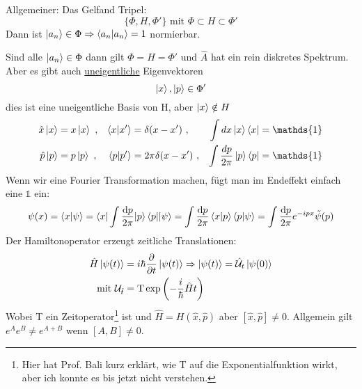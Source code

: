 		Allgemeiner: Das Gelfand Tripel:
			\begin{equation*}
				\{\Phi, H, \Phi'\} \text{~mit~} \Phi \subset H \subset \Phi'
			\end{equation*}
		Dann ist $\ket{a_n} \in \Phi \Rightarrow \braket{a_n | a_n} = 1$ normierbar.
		
		Sind alle $\ket{a_n} \in \Phi$ dann gilt $\Phi = H = \Phi'$ und $\hat{A}$ hat ein rein diskretes Spektrum.
		Aber es gibt auch \underline{uneigentliche} Eigenvektoren
			\begin{equation*}
				\ket{x}, \ket{p} \in \Phi'
			\end{equation*}
		dies ist eine uneigentliche Basis von H, aber $\ket{x} \notin H$
			\begin{align*}
				\hat{x} \ket{x} &= x \ket{x} ~,& \braket{ x | x'} &= \delta(x-x') ~,& \int dx \ket{x} \bra{x} &= \mathds{1} \\		
				\hat{p} \ket{p} &= p \ket{p} ~,& \braket{ p|p'} &= 2\pi \delta (x-x') ~,& \int \frac{dp}{2\pi} \ket{p} \bra{p} &= \mathds{1}
			\end{align*}		
		Wenn wir eine Fourier Transformation machen, fügt man im Endeffekt einfach eine $\mathds{1}$ ein:
			\begin{align*}
				\psi(x) =
				\braket{ x|\psi } = \braket{x | \int \frac{\mathrm{d} p}{2\pi} | p} \braket{p | |\psi} =
				\int \frac{\mathrm{d} p}{2\pi} \braket{x|p} \braket{p|\psi} = 
				\int \frac{\mathrm{d} p}{2\pi} e^{-ipx} \tilde{\psi}(p)
			\end{align*}
		Der Hamiltonoperator erzeugt zeitliche Translationen:
			\begin{align*}
				\hat{H} \ket{\psi(t)} &= i\hbar \frac{\partial}{\partial t} \ket{\psi(t)}
				\Rightarrow \ket{\psi(t)} = \hat{\mathcal{U}}_t \ket{\psi(0)} \\
				\text{mit~} \mathcal{U}_{\hat{t}} &= \text{T} \exp \left( -\frac{i}{\hbar} \hat{H} t \right)
			\end{align*}
		Wobei T ein Zeitoperator\footnote{Hier hat Prof. Bali kurz erklärt, wie T auf die Exponentialfunktion wirkt, aber ich konnte es bis jetzt nicht verstehen.} ist und $\hat{H}=H(\hat{x}, \hat{p})$ aber $[\hat{x}, \hat{p}] \neq 0$. 
		Allgemein gilt $e^A e^B \neq e^{A+B}$ wenn $[A,B] \neq 0$.
		
